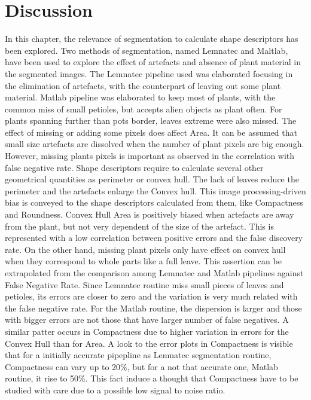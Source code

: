\documentclass{frontiersSCNS} %
\begin{document}
\section{Discussion}
In this chapter, the relevance of segmentation to calculate shape descriptors has been explored. Two methods of segmentation, named Lemnatec and Maltlab, have been used to explore the effect of artefacts and absence of plant material in the segmented images. The Lemnatec pipeline used was elaborated focusing in the elimination of artefacts, with the counterpart of leaving out some plant material. Matlab pipeline was elaborated to keep most of plants, with the common miss of small petioles, but accepts alien objects as plant often. For plants spanning further than pots border, leaves extreme were also missed.
The effect of missing or adding some pixels does affect Area. It can be assumed that small size artefacts are dissolved when the number of plant pixels are big enough. However, missing plants pixels is important as observed in the correlation with false negative rate.
Shape descriptors require to calculate several other geometrical quantities as perimeter or convex hull. The lack of leaves reduce the perimeter and the artefacts enlarge the Convex hull. This image processing-driven bias is conveyed to the shape descriptors calculated from them, like Compactness and Roundness.
Convex Hull Area is positively biased when artefacts are away from the plant, but not very dependent of the size of the artefact. This is represented with a low correlation between positive errors and the false discovery rate. On the other hand, missing plant pixels only have effect on convex hull when they correspond to whole parts like a full leave. This assertion can be extrapolated from the comparison among Lemnatec and Matlab pipelines against False Negative Rate. Since Lemnatec routine miss small pieces of leaves and petioles, its errors are closer to zero and the variation is very much related with the false negative rate. For the Matlab routine, the dispersion is larger and those with bigger errors are not those that have larger number of false negatives. A similar patter occurs in Compactness due to higher variation in errors for the Convex Hull than for Area. A look to the error plots in Compactness is visible that for a initially accurate pipepline as Lemnatec segmentation routine, Compactness can vary up to 20\%, but for a not that accurate one, Matlab routine, it rise to 50\%. This fact induce a thought that Compactness have to be studied with care due to a possible low signal to noise ratio.
\end{document}
